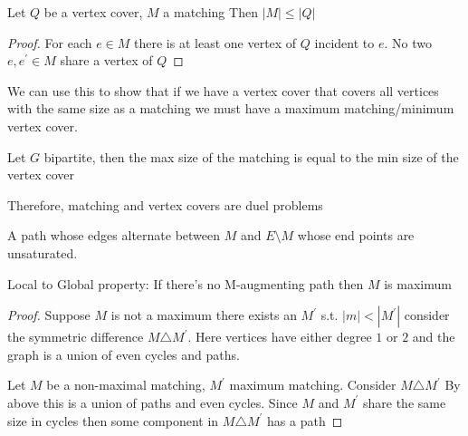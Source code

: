 
\begin{lemma}
	Let \(Q\) be a vertex cover, \(M\) a matching
	Then \(|M| \leq |Q|\) 
\end{lemma}
\begin{proof}
	For each \(e \in M\) there is at least one vertex of \(Q\) incident to \(e\). No two \(e, e^\prime \in M\) share a vertex of \(Q\)
\end{proof}

\begin{note}
	We can use this to show that if we have a vertex cover that covers all vertices with the same size as a matching we must have a maximum matching/minimum vertex cover.
\end{note} 

\begin{theorem}[König]
	\label{thm:könig}
	Let \(G\) bipartite, then the max size of the matching is equal to the min size of the vertex cover
\end{theorem} 

\begin{remark}
	Therefore, matching and vertex covers are duel problems
\end{remark}

\begin{definition}
	\label{def:m-augmenting-path}
	A path whose edges alternate between \(M\) and \(E\setminus M\) whose end points are unsaturated.
\end{definition}  

\begin{theorem}
	\label{thm:maximum matching}
	Local to Global property: If there's no M-augmenting path then \(M\) is maximum
\end{theorem}
\begin{proof}
	Suppose \(M\) is not a maximum there exists an \(M^\prime\) s.t. \(|m| < | M^\prime|\) consider the symmetric difference \(M \triangle M^\prime\). Here vertices have either degree \(1\) or \(2\) and the graph is a union of even cycles and paths. 

	Let \(M\) be a non-maximal matching, \(M^\prime\) maximum matching. Consider \(M \triangle M^\prime\) By above this is a union of paths and even cycles. Since \(M\) and \(M^\prime\) share the same size in cycles then some component in \(M \triangle M^\prime\) has a path
\end{proof}



